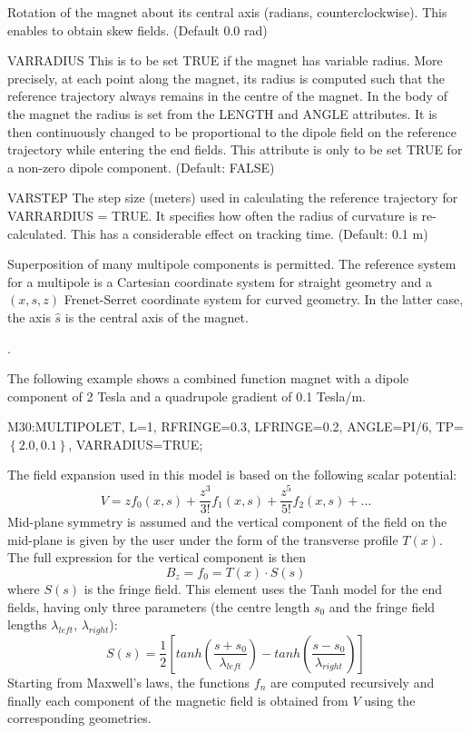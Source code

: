 \begin{kdescription}
  Rotation of the magnet about its central axis (radians, counterclockwise). This enables to obtain skew fields. (Default 0.0 rad)  
  \item[VARRADIUS]
  This is to be set TRUE if the magnet has variable radius. More precisely, at each point along the magnet, its radius is computed such that the reference trajectory always remains in the centre of the magnet. In the body of the magnet the radius is set from the LENGTH and ANGLE attributes. It is then continuously changed to be proportional to the dipole field on the reference trajectory while entering the end fields. This attribute is only to be set TRUE for a non-zero dipole component. (Default: FALSE) 
\item[VARSTEP]
  The step size (meters) used in calculating the reference trajectory for VARRARDIUS = TRUE. It specifies how often the radius of curvature is re-calculated. This has a considerable effect on tracking time. (Default: 0.1 m)
\end{kdescription}

Superposition of many multipole components is permitted.
The reference system for a multipole is a Cartesian coordinate system for straight
geometry and a $(x,s,z)$ Frenet-Serret coordinate system for curved geometry. In the latter case, the axis $\hat{s}$ is the central axis of the magnet. 

 
.

\noindent The following example shows a combined function magnet with a dipole component
of 2 Tesla and a quadrupole gradient of 0.1 Tesla/m.
\begin{example}
M30:MULTIPOLET, L=1, RFRINGE=0.3, LFRINGE=0.2, ANGLE=PI/6, TP=$\left\{ 2.0, 0.1 \right\}$, VARRADIUS=TRUE;
\end{example}

The field expansion used in this model is based on the following scalar potential:
\begin{equation}
 V = z f_0(x,s) + \frac{z^3}{3!} f_1(x,s) + \frac{z^5}{5!} f_2(x,s) + \dots 
\end{equation}
Mid-plane symmetry is assumed and the vertical component of the field on the mid-plane is given by the user under the form of the transverse profile $T(x)$. The full expression for the vertical component is then 
\begin{equation}
B_z = f_0 = T(x) \cdot S(s)
\end{equation} 
where $S(s)$ is the fringe field. This element uses the Tanh model for the end fields, having only three parameters (the centre length $s_0$ and the fringe field lengths $\lambda_{left}$, $\lambda_{right}$):
\begin{equation}
 S(s) = \frac{1}{2} \left[ tanh \left( \frac{s + s_0}{\lambda_{left}} \right) - 
 tanh \left( \frac{s - s_0}{\lambda_{right}} \right) \right]
\end{equation}
Starting from Maxwell's laws, the functions $f_n$ are computed recursively and finally each component of the magnetic field is obtained from $V$ using the corresponding geometries.



